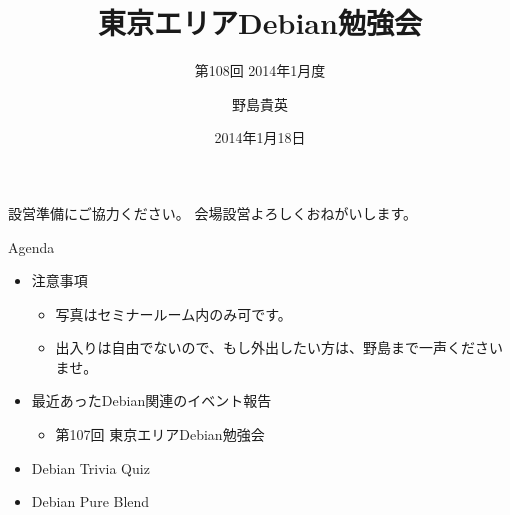 \title{東京エリアDebian勉強会}
\subtitle{第108回 2014年1月度}
\author{野島貴英}
\date{2014年1月18日}



\begin{frame}
\titlepage{}
\end{frame}

\begin{frame}{設営準備にご協力ください。}
会場設営よろしくおねがいします。
\end{frame}

\begin{frame}{Agenda}
 \begin{minipage}[t]{0.45\hsize}
  \begin{itemize}
   \item 注意事項
	 \begin{itemize}
	  \item 写真はセミナールーム内のみ可です。
          \item 出入りは自由でないので、もし外出したい方は、野島まで一声くださいませ。
	 \end{itemize}
   \item 最近あったDebian関連のイベント報告
	 \begin{itemize}
	  \item 第107回 東京エリアDebian勉強会
	 \end{itemize}
  \end{itemize}
 \end{minipage} 
 \begin{minipage}[t]{0.45\hsize}
  \begin{itemize}
   \item Debian Trivia Quiz
   \item Debian Pure Blend
  \end{itemize}
 \end{minipage}
\end{frame}


